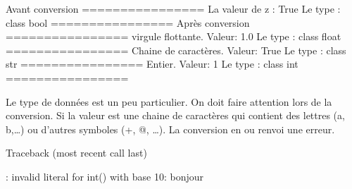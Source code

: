 \documentclass[letterpaper,10pt,french]{sphinxmanual}
\begin{document}
\begin{sphinxVerbatim}[commandchars=\\\{\}]
			Avant conversion
================
La valeur de z : True 			Le type : \PYGZlt{}class \PYGZsq{}bool\PYGZsq{}\PYGZgt{}
================
			Après conversion
================
virgule flottante. 	Valeur: 1.0 	Le type : \PYGZlt{}class \PYGZsq{}float\PYGZsq{}\PYGZgt{}
================
Chaine de caractères. 	Valeur: True 	Le type : \PYGZlt{}class \PYGZsq{}str\PYGZsq{}\PYGZgt{}
================
Entier. 		Valeur: 1 	Le type : \PYGZlt{}class \PYGZsq{}int\PYGZsq{}\PYGZgt{}
================
\end{sphinxVerbatim}

\sphinxAtStartPar
Le type de données  est un peu particulier. On doit faire attention lors de la conversion. Si la valeur est une chaine de caractères qui contient des lettres (a, b,…) ou d’autres symboles (+, @, …). La conversion en  ou  renvoi une erreur.

\begin{sphinxVerbatim}[commandchars=\\\{\}]
  
\end{sphinxVerbatim}

\begin{sphinxVerbatim}[commandchars=\\\{\}]
Traceback (most recent call last)
\PYGZbs{}\PYGZbs{}\PYGZbs{}\PYGZbs{}\PYGZbs{}  
   
 

: invalid literal for int() with base 10: \PYGZsq{}bonjour\PYGZsq{}
\end{sphinxVerbatim}
\end{document}
